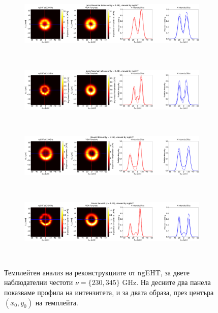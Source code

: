 \begin{figure}[h!]
	\centering
	\begin{subfigure}{12cm}
		\hspace{-1.5cm}
		\includegraphics[scale = 0.13]{Ehtim_Vida_plot_ngEHT_230_JNW.png}
	\end{subfigure}\\
	\begin{subfigure}{12cm}
		\hspace{-1.5cm}
		\includegraphics[scale = 0.13]{Ehtim_Vida_plot_ngEHT_345_JNW.png}
	\end{subfigure}\\
	\begin{subfigure}{12cm}
		\hspace{-1.5cm}
		\includegraphics[scale = 0.13]{Ehtim_Vida_plot_ngEHT_230_GB.png}
	\end{subfigure}\\
	\begin{subfigure}{12cm}
		\hspace{-1.5cm}
		\includegraphics[scale = 0.13]{Ehtim_Vida_plot_ngEHT_345_GB.png}
	\end{subfigure}\\
	\label{VIDA_ngEHT_230}
	\caption[Темплейтен анализ на реконструкциите от ngEHT]{Темплейтен анализ на реконструкциите от ngEHT, за двете наблюдателни честоти $\nu = \{230, 345\}$ GHz. На десните два панела показваме профила на интензитета, и за двата образа, през центъра $(x_0,y_0)$ на темплейта.} 
\end{figure}

